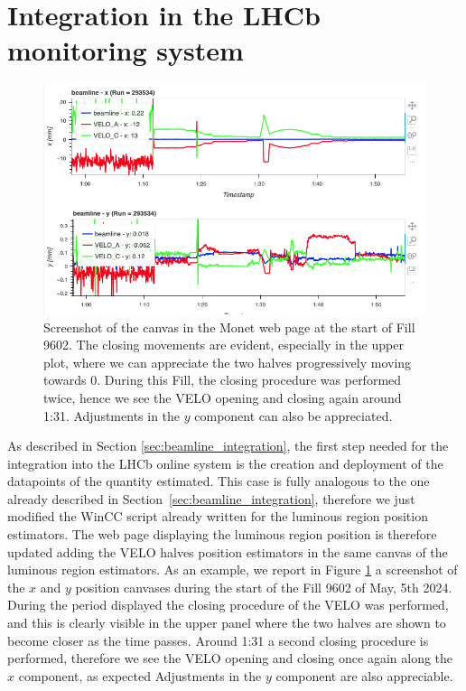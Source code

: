 \section{Integration in the LHCb monitoring system}\label{sec:integration_detector}
\begin{figure}
    \centering
    \includegraphics[width=\textwidth]{figures/VELO_closing_xy.png}
    \caption{Screenshot of the canvas in the Monet web page at the start of Fill 9602. The closing movements are evident, especially in the upper plot, where we can appreciate the two halves progressively moving towards 0. During this Fill, the closing procedure was performed twice, hence we see the VELO opening and closing again around 1:31. Adjustments in the $y$ component can also be appreciated.} 
    \label{fig:VELO_closing_xy}
\end{figure}

As described in Section \ref{sec:beamline_integration}, the first step needed for the integration into the LHCb online system is the creation and deployment of the datapoints of the quantity estimated. This case is fully analogous to the one already described in Section~\ref{sec:beamline_integration}, therefore we just modified the WinCC script already written for the luminous region position estimators. The web page displaying the luminous region position is therefore updated adding the VELO halves position estimators in the same canvas of the luminous region estimators. As an example, we report in Figure \ref{fig:VELO_closing_xy} a screenshot of the $x$ and $y$ position canvases during the start of the Fill 9602 of May, 5th 2024. During the period displayed the closing procedure of the VELO was performed, and this is clearly visible in the upper panel where the two halves are shown to become closer as the time passes. Around 1:31 a second closing procedure is performed, therefore we see the VELO opening and closing once again along the $x$ component, as expected Adjustments in the $y$ component are also appreciable.

